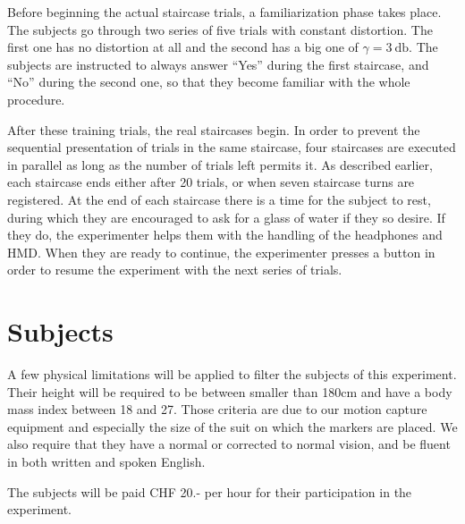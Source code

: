 Before beginning the actual staircase trials, a familiarization phase takes place. The subjects go through two series of five trials with constant distortion. The first one has no distortion at all and the second has a big one of $\gamma = \SI{3}{\decibel}$. The subjects are instructed to always answer ``Yes'' during the first staircase, and ``No'' during the second one, so that they become familiar with the whole procedure.

After these training trials, the real staircases begin. In order to prevent the sequential presentation of trials in the same staircase, four staircases are executed in parallel as long as the number of trials left permits it. As described earlier, each staircase ends either after 20 trials, or when seven staircase turns are registered. At the end of each staircase there is a time for the subject to rest, during which they are encouraged to ask for a glass of water if they so desire. If they do, the experimenter helps them with the handling of the headphones and HMD. When they are ready to continue, the experimenter presses a button in order to resume the experiment with the next series of trials.

\section{Subjects}

A few physical limitations will be applied to filter the subjects of this experiment. Their height will be required to be between smaller than 180cm and have a body mass index between 18 and 27. Those criteria are due to our motion capture equipment and especially the size of the suit on which the markers are placed. We also require that they have a normal or corrected to normal vision, and be fluent in both written and spoken English.

The subjects will be paid CHF 20.- per hour for their participation in the experiment.
